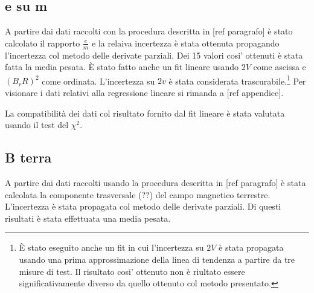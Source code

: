 \subsection{e su m}
A partire dai dati raccolti con la procedura descritta in [ref paragrafo] è stato calcolato il rapporto $\frac{e}{m}$ e la relaiva incertezza è stata ottenuta propagando l'incertezza col metodo delle derivate parziali. Dei 15 valori cosi' ottenuti è stata fatta la media pesata. 
È stato fatto anche un fit lineare usando $2V$ come ascissa e $(B_rR)^2$ come ordinata. L'incertezza su $2v$ è stata considerata trascurabile.\footnote{È stato eseguito anche un fit in cui l'incertezza su $2V$ è stata propagata usando una prima approssimazione della linea di tendenza a partire da tre misure di test. Il risultato cosi' ottenuto non è riultato essere significativamente diverso da quello ottenuto col metodo presentato.}
Per visionare i dati relativi alla regressione lineare si rimanda a [ref appendice].

La compatibilità dei dati col risultato fornito dal fit lineare è stata valutata usando il test del $\chi^2$.

\subsection{B terra}
A partire dai  dati raccolti usando la procedura descritta in [ref paragrafo] è stata calcolata la componente trasversale (??) del campo magnetico terrestre. L'incertezza è stata propagata col metodo delle derivate parziali. Di questi risultati è stata effettuata una media pesata.


